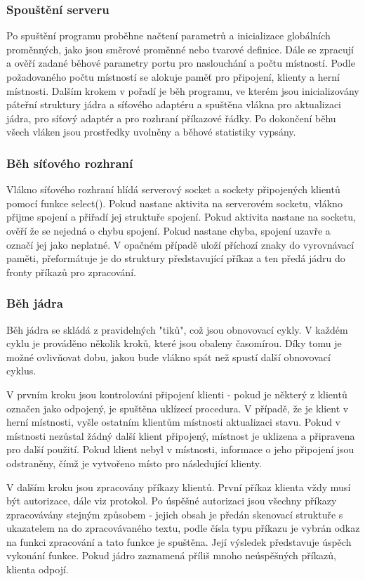\documentclass[12pt,a4paper]{article}
\begin{document}
\subsubsection{Spouštění serveru}
Po spuštění programu proběhne načtení parametrů a inicializace globálních proměnných, jako jsou směrové proměnné nebo tvarové definice.
Dále se zpracují a ověří zadané běhové parametry portu pro naslouchání a počtu místností. Podle požadovaného počtu místností se alokuje paměť pro připojení, klienty a herní místnosti.
Dalším krokem v pořadí je běh programu, ve kterém jsou inicializovány páteřní struktury jádra a síťového adaptéru a spuštěna vlákna pro aktualizaci jádra, pro síťový adaptér a pro rozhraní příkazové řádky.
Po dokončení běhu všech vláken jsou prostředky uvolněny a běhové statistiky vypsány.
\subsubsection{Běh síťového rozhraní}
Vlákno síťového rozhraní hlídá serverový socket a sockety připojených klientů pomocí funkce select(). Pokud nastane aktivita na serverovém socketu, vlákno přijme spojení a přiřadí jej struktuře spojení.
Pokud aktivita nastane na socketu, ověří že se nejedná o chybu spojení. Pokud nastane chyba, spojení uzavře a označí jej jako neplatné. V opačném případě uloží příchozí znaky do vyrovnávací paměti, přeformátuje je do struktury představující příkaz a ten předá jádru do fronty příkazů pro zpracování.
\subsubsection{Běh jádra}
Běh jádra se skládá z pravidelných "tiků", což jsou obnovovací cykly. V každém cyklu je prováděno několik kroků, které jsou obaleny časomírou. Díky tomu je možné ovlivňovat dobu, jakou bude vlákno spát než spustí další obnovovací cyklus.

V prvním kroku jsou kontrolováni připojení klienti - pokud je některý z klientů označen jako odpojený, je spuštěna uklízecí procedura. V případě, že je klient v herní místnosti, vyšle ostatním klientům místnosti aktualizaci stavu. Pokud v místnosti nezůstal žádný další klient připojený, místnost je uklizena a připravena pro další použití. Pokud klient nebyl v místnosti, informace o jeho připojení jsou odstraněny, čímž je vytvořeno místo pro následující klienty.

V dalším kroku jsou zpracovány příkazy klientů. První příkaz klienta vždy musí být autorizace, dále viz protokol. Po úspěšné autorizaci jsou všechny příkazy zpracovávány stejným způsobem - jejich obsah je předán skenovací struktuře s ukazatelem na do zpracovávaného textu, podle čísla typu příkazu je vybrán odkaz na funkci zpracování a tato funkce je spuštěna. Její výsledek představuje úspěch vykonání funkce. Pokud jádro zaznamená příliš mnoho neúspěšných příkazů, klienta odpojí.
\end{document}
